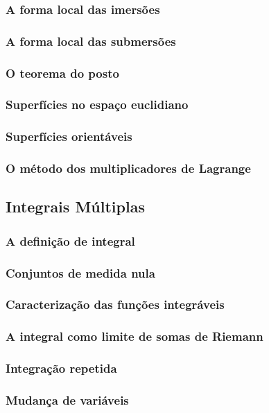 \documentclass{article}
\theoremstyle{plain}
\theoremstyle{definition}
\theoremstyle{remark}
\begin{document}
   \subsubsection{ A forma local das imersões}
   \subsubsection{ A forma local das submersões}
   \subsubsection{ O teorema do posto}
   \subsubsection{ Superfícies no espaço euclidiano}
   \subsubsection{ Superfícies orientáveis}
   \subsubsection{ O método dos multiplicadores de Lagrange}

\subsection{ Integrais Múltiplas}
   \subsubsection{A definição de integral}
   \subsubsection{Conjuntos de medida nula}
   \subsubsection{Caracterização das funções integráveis}
   \subsubsection{A integral como limite de somas de Riemann}
   \subsubsection{Integração repetida}
   \subsubsection{Mudança de variáveis}
\end{document}
